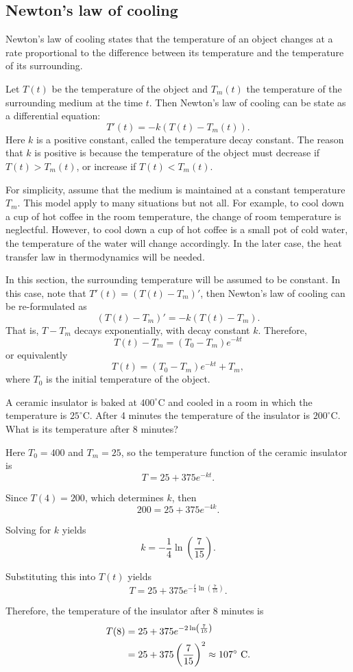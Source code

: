 \subsection{Newton’s law of cooling}

Newton’s law of cooling states that the temperature of an object changes at a rate proportional to the difference between its temperature and the temperature of its surrounding.

Let $T(t)$ be the temperature of the object and $T_m(t)$ the temperature of the surrounding medium at the time $t$. Then Newton's law of cooling can be state as a differential equation:
\[T'(t)=-k(T(t)-T_m(t)).\]
Here $k$ is a positive constant, called the temperature decay constant. The reason that $k$ is positive is because the temperature of the object must decrease if $T(t) > T_m(t)$, or increase if $T(t) < T_m(t)$.

For simplicity, assume that the medium is maintained at a constant temperature $T_m$. This model apply to many situations but not all. For example, to cool down a cup of hot coffee in the room temperature, the change of room temperature is neglectful. However, to cool down a cup of hot coffee is a small pot of cold water, the temperature of the water will change accordingly. In the later case, the heat transfer law in thermodynamics will be needed.

In this section, the surrounding temperature will be assumed to be constant. In this case, note that $T'(t)=(T(t)-T_m)'$, then Newton's law of cooling can be re-formulated as 
\[(T(t)-T_m)'=-k(T(t)-T_m).\]
That is, $T-T_m$ decays exponentially, with decay constant $k$. Therefore,
\[T(t)-T_m=(T_0-T_m)e^{-kt}\]
or equivalently
\[T(t)=(T_0-T_m)e^{-kt}+T_m,\]
where $T_0$ is the initial temperature of the object.

\begin{example}
  A ceramic insulator is baked at $400^\circ$C and cooled in a room in which the temperature is $25^\circ$C. After 4 minutes the temperature of the insulator is $200^\circ$C. What is its temperature after 8 minutes?
\end{example}
\begin{solution}
  Here $T_0=400$ and $T_m=25$, so the temperature function of the ceramic insulator is
  \[T=25+375e^{-kt}.\]
  
  Since $T(4)=200$, which determines $k$, then
  \[200=25+375e^{-4k}.\]

  Solving for $k$ yields
  \[k=-\frac{1}{4}\ln\left(\frac{7}{15}\right).\]
  
  Substituting this into $T(t)$ yields
  \[T=25+375 e^{-\frac{t}{4}\ln\left(\frac{7}{15}\right)}.\]

  Therefore, the temperature of the insulator after 8 minutes is
  \[
    \begin{aligned}
      T(8) & = 25+375 e^{-2\ln\left(\frac{7}{15}\right)} \\
      & = 25+375 \left(\frac{7}{15}\right)^2 \approx 107^\circ \textup{ C}. 
    \end{aligned}
  \]
\end{solution}

